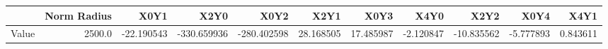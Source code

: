 \documentclass[convert={convertexe={magick.exe}, density={150}}]{standalone}
\begin{document}
\begin{tabular}{lrrrrrrrrrr}
\toprule
{} &  Norm Radius &       X0Y1 &        X2Y0 &        X0Y2 &       X2Y1 &       X0Y3 &      X4Y0 &       X2Y2 &      X0Y4 &      X4Y1 \\
\midrule
Value &       2500.0 & -22.190543 & -330.659936 & -280.402598 &  28.168505 &  17.485987 & -2.120847 & -10.835562 & -5.777893 &  0.843611 \\
\bottomrule
\end{tabular}
\end{document}

